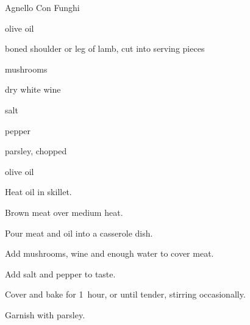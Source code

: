 \begin{recipe}{Agnello Con Funghi}{}{}

\begin{ingredients}
\item {} olive oil
\item {} boned shoulder or leg of lamb, cut into serving pieces
\item {} mushrooms
\item {} dry white wine
\item salt
\item pepper
\item parsley, chopped
\item olive oil
\end{ingredients}

\begin{directions}
\item Heat oil in skillet.
\item Brown meat over medium heat.
\item Pour meat and oil into a casserole dish.
\item Add mushrooms, wine and enough water to cover meat.
\item Add salt and pepper to taste.
\item Cover and bake for 1~hour, or until tender, stirring occasionally.
\item Garnish with parsley.
\end{directions}

\end{recipe}
